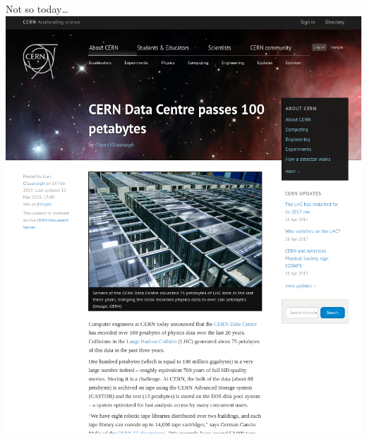 \documentclass{beamer}
\begin{document}
\begin{frame}{Not so today\ldots}
\vspace{0.5 cm}\includegraphics[width=0.75\linewidth]{cern_petabytes.png}

\vspace{-6.4 cm}\vspace{6.4 cm}
\end{frame}
\end{document}
